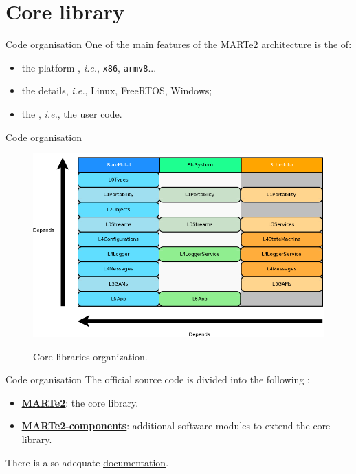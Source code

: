 
\section{Core library}
\graphicspath{{figs/section2/}}

\begin{frame}{Code organisation}
	One of the main features of the MARTe2 architecture is the  of:
	\begin{itemize}
		\item the platform , \emph{i.e.}, \texttt{x86}, \texttt{armv8}...
		\item the  details, \emph{i.e.}, Linux, FreeRTOS, Windows;
		\item the , \emph{i.e.}, the user code.
	\end{itemize}
\end{frame}
\begin{frame}{Code organisation}
	\begin{figure}
		\centering
		\includegraphics[scale=.35]{Tiers.png}
		\label{fig:tiers}
		\caption{Core libraries organization.}
	\end{figure}
\end{frame}
\begin{frame}{Code organisation}
	The official source code is divided into the following :
  \begin{itemize}
    \item \href{https://vcis-gitlab.f4e.europa.eu/aneto/MARTe2}{\color{blue}\underline{\textbf{MARTe2}}}: the core library.
    \item \href{https://vcis-gitlab.f4e.europa.eu/aneto/MARTe2-components}{\color{blue}\underline{\textbf{MARTe2-components}}}: additional software modules to extend the core library.
  \end{itemize}
  \bigskip
  There is also adequate \href{https://vcis.f4e.europa.eu/marte2-docs/master/html/}{\color{blue}\underline{documentation}}.
\end{frame}

